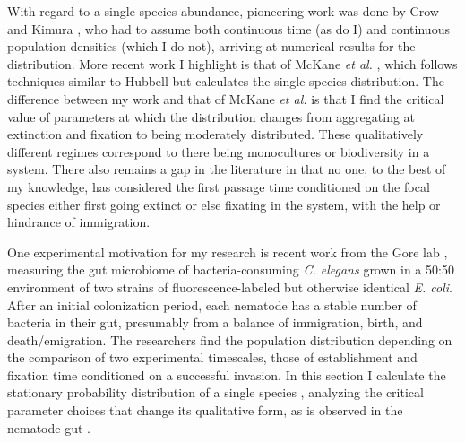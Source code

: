 With regard to a single species abundance, pioneering work was done by Crow and Kimura \cite{Crow1956,Kimura1983}, who had to assume both continuous time (as do I) and continuous population densities (which I do not), arriving at numerical results for the distribution. 
More recent work I highlight is that of McKane \emph{et al.} \cite{McKane2003}, which follows techniques similar to Hubbell but calculates the single species distribution. %
The difference between my work and that of McKane \emph{et al.} is that I find the critical value of parameters at which the distribution changes from aggregating at extinction and fixation to being moderately distributed. %
These qualitatively different regimes correspond to there being monocultures or biodiversity in a system. 
There also remains a gap in the literature in that no one, to the best of my knowledge, has considered the first passage time conditioned on the focal species either first going extinct or else fixating in the system, with the help or hindrance of immigration. %

One experimental motivation for my research is recent work from the Gore lab \cite{Vega2017}, measuring the gut microbiome of bacteria-consuming \emph{C. elegans} grown in a 50:50 environment of two strains of fluorescence-labeled but otherwise identical \emph{E. coli}. 
After an initial colonization period, each nematode has a stable number of bacteria in their gut, presumably from a balance of immigration, birth, and death/emigration. 
The researchers find the population distribution depending on the comparison of two experimental timescales, those of establishment and fixation time conditioned on a successful invasion. 
In this section I calculate the stationary probability distribution of a single species \cite{McKane2003}, analyzing the critical parameter choices that change its qualitative form, as is observed in the nematode gut \cite{Vega2017}. 

